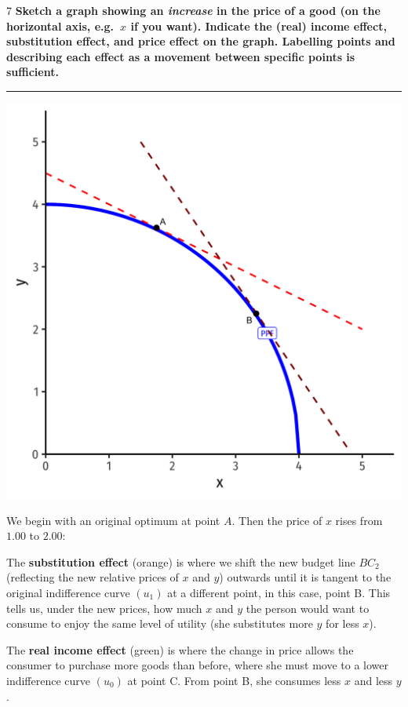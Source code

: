 \documentclass[
  11pt,
]{article}
\begin{document}
7 \textbf{Sketch a graph showing an \emph{increase} in the price of a
good (on the horizontal axis, e.g.~\(x\) if you want). Indicate the
(real) income effect, substitution effect, and price effect on the
graph. Labelling points and describing each effect as a movement between
specific points is sufficient.}

\begin{center}\rule{0.5\linewidth}{0.5pt}\end{center}

\includegraphics{../slides/1.6-slides_files/figure-html/unnamed-chunk-12-1.png}

We begin with an original optimum at point \(A\). Then the price of
\(x\) rises from \(1.00\) to \(2.00\):

The \textbf{substitution effect} (orange) is where we shift the new
budget line \(BC_2\) (reflecting the new relative prices of \(x\) and
\(y\)) outwards until it is tangent to the original indifference curve
\((u_1)\) at a different point, in this case, point B. This tells us,
under the new prices, how much \(x\) and \(y\) the person would want to
consume to enjoy the same level of utility (she substitutes more \(y\)
for less \(x\)).

The \textbf{real income effect} (green) is where the change in price
allows the consumer to purchase more goods than before, where she must
move to a lower indifference curve \((u_0)\) at point C. From point B,
she consumes less \(x\) and less \(y\).
\end{document}

